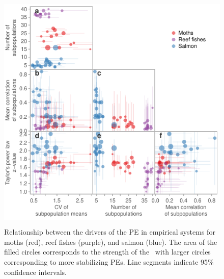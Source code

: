 \begin{figure}[htbp]
  \centering
  \includegraphics[height=4.6in]{prophets/bias_factors_cross_correlation.pdf}
  \caption[Relationship between the drivers of the PE in empirical systems for
    moths (red), reef fishes (purple), and salmon (blue).]{Relationship between the drivers of the PE in empirical systems for
    moths (red), reef fishes (purple), and salmon (blue).  The area of the
    filled circles corresponds to the strength of the \tilmanPE\ with larger
    circles corresponding to more stabilizing PEs.  Line segments indicate
    95\% confidence intervals.}
  \label{fig:factors-cor}
\end{figure}

